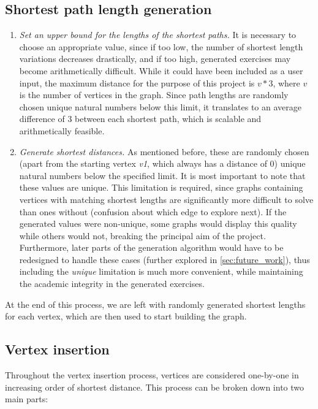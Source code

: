 \documentclass{l4proj}
\begin{document}
\subsection{Shortest path length generation}
\label{sec:shortestpathdesign}
\begin{enumerate}[i]
	\item
	\emph{Set an upper bound for the lengths of the shortest paths.} It is necessary to choose an appropriate value, since if too low, the number of shortest length variations decreases drastically, and if too high, generated exercises may become arithmetically difficult. While it could have been included as a user input, the maximum distance for the purpose of this project is $v*3$, where $v$ is the number of vertices in the graph. Since path lengths are randomly chosen unique natural numbers below this limit, it translates to an average difference of $3$ between each shortest path, which is scalable and arithmetically feasible.

	\item
	\emph{Generate shortest distances.} As mentioned before, these are randomly chosen (apart from the starting vertex \emph{v1}, which always has a distance of $0$) unique natural numbers below the specified limit. It is most important to note that these values are unique. This limitation is required, since graphs containing vertices with matching shortest lengths are significantly more difficult to solve than ones without (confusion about which edge to explore next). If the generated values were non-unique, some graphs would display this quality while others would not, breaking the principal aim of the project. Furthermore, later parts of the generation algorithm would have to be redesigned to handle these cases (further explored in \autoref{sec:future_work}), thus including the \emph{unique} limitation is much more convenient, while maintaining the academic integrity in the generated exercises.
\end{enumerate}

At the end of this process, we are left with randomly generated shortest lengths for each vertex, which are then used to start building the graph.

\subsection{Vertex insertion}
\label{sec:vi}

Throughout the vertex insertion process, vertices are considered one-by-one in increasing order of shortest distance. This process can be broken down into two main parts:
\end{document}

